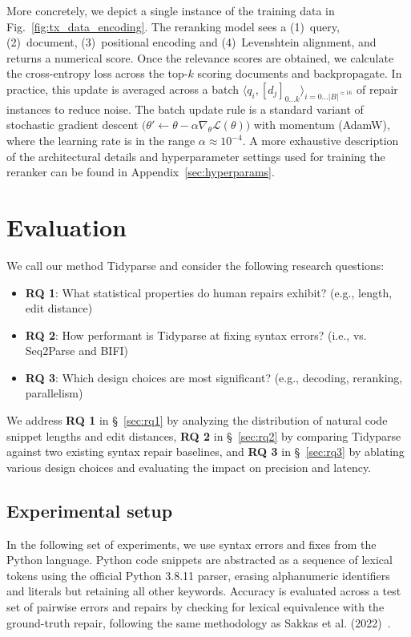 \documentclass[sigplan,acmsmall,nonacm,screen]{acmart}\settopmatter{printfolios=false,printccs=false,printacmref=false}
\begin{document}
More concretely, we depict a single instance of the training data in Fig.~\ref{fig:tx_data_encoding}. The reranking model sees a (1)~query, (2)~document, (3)~positional encoding and (4)~Levenshtein alignment, and returns a numerical score. Once the relevance scores are obtained, we calculate the cross-entropy loss across the top-$k$ scoring documents and backpropagate. In practice, this update is averaged across a batch $\langle q_i, [d_j]_{0\ldots k}\rangle_{i=0\ldots |B|^{\approx 16}}$ of repair instances to reduce noise. The batch update rule is a standard variant of stochastic gradient descent $\big(\theta' \leftarrow \theta - \alpha \nabla_{\theta} \mathcal{L}(\theta)\big)$ with momentum (AdamW), where the learning rate is in the range $\alpha\approx10^{-4}$. A more exhaustive description of the architectural details and hyperparameter settings used for training the reranker can be found in Appendix~\ref{sec:hyperparams}.

\clearpage\section{Evaluation}\label{sec:eval}

We call our method Tidyparse and consider the following research questions:

\begin{itemize}
\item \textbf{RQ 1}: What statistical properties do human repairs exhibit? (e.g., length, edit distance)
\item \textbf{RQ 2}: How performant is Tidyparse at fixing syntax errors? (i.e., vs. Seq2Parse and BIFI)
\item \textbf{RQ 3}: Which design choices are most significant? (e.g., decoding, reranking, parallelism)
\end{itemize}

We address \textbf{RQ 1} in \S~\ref{sec:rq1} by analyzing the distribution of natural code snippet lengths and edit distances, \textbf{RQ 2} in \S~\ref{sec:rq2} by comparing Tidyparse against two existing syntax repair baselines, and \textbf{RQ 3} in \S~\ref{sec:rq3} by ablating various design choices and evaluating the impact on precision and latency.

\subsection{Experimental setup}

In the following set of experiments, we use syntax errors and fixes from the Python language. Python code snippets are abstracted as a sequence of lexical tokens using the official Python 3.8.11 parser, erasing alphanumeric identifiers and literals but retaining all other keywords. Accuracy is evaluated across a test set of pairwise errors and repairs by checking for lexical equivalence with the ground-truth repair, following the same methodology as Sakkas et al. (2022)~\cite{sakkas2022seq2parse}.
\end{document}

